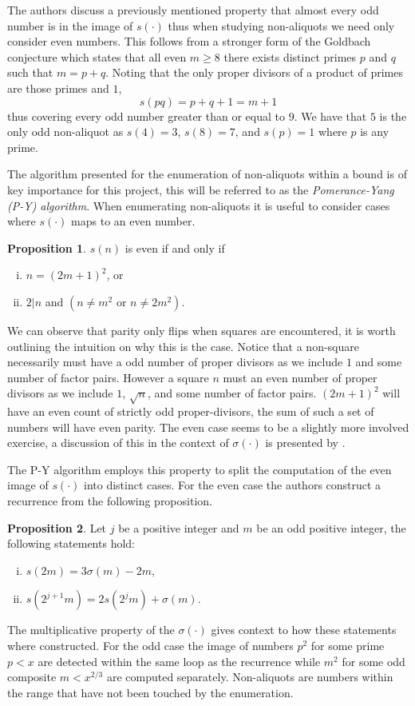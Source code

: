 \documentclass{article}
\theoremstyle{definition}
\newtheorem{proposition}{Proposition}[section]
\begin{document}
The authors discuss a previously mentioned property that almost every odd number is in the image of $s(\cdot)$ thus when studying non-aliquots we need only consider even numbers. This follows from a stronger form of the Goldbach conjecture which states that all even $m \geq 8$ there exists distinct primes $p$ and $q$ such that $m = p+q$. Noting that the only proper divisors of a product of primes are those primes and $1$, $$s(pq) = p + q + 1 = m + 1$$ thus covering every odd number greater than or equal to $9$. We have that $5$ is the only odd non-aliquot as $s(4) = 3$, $s(8) = 7$, and $s(p) = 1$ where $p$ is any prime.

The algorithm presented for the enumeration of non-aliquots within a bound is of key importance for this project, this will be referred to as the \textit{Pomerance-Yang (P-Y) algorithm}. When enumerating non-aliquots it is useful to consider cases where $s(\cdot)$ maps to an even number.
\begin{proposition}
    $s(n)$ is even if and only if
    \begin{enumerate}[(i)]
        \item $n = (2m+1)^2$, or
        \item $2 | n$ and $(n \neq m^2 \text{ or } n \neq 2m^2)$.
    \end{enumerate}
\end{proposition}

We can observe that parity only flips when squares are encountered, it is worth outlining the intuition on why this is the case. Notice that a non-square necessarily must have a odd number of proper divisors as we include $1$ and some number of factor pairs. However a square $n$ must an even number of proper divisors as we include $1$, $\sqrt{n}$, and some number of factor pairs. $(2m+1)^2$ will have an even count of strictly odd proper-divisors, the sum of such a set of numbers will have even parity. The even case seems to be a slightly more involved exercise, a discussion of this in the context of $\sigma(\cdot)$ is presented by \cite{sumdiv_odd}. 

The P-Y algorithm employs this property to split the computation of the even image of $s(\cdot)$ into distinct cases. For the even case the authors construct a recurrence from the following proposition.
\begin{proposition}
    Let $j$ be a positive integer and $m$ be an odd positive integer, the following statements hold:
      \begin{enumerate}[(i)]
        \item $s(2m) = 3\sigma(m) - 2m$,
        \item $s(2^{j+1}m) = 2s(2^{j}m) + \sigma(m)$.
    \end{enumerate}
\end{proposition}
The multiplicative property of the $\sigma(\cdot)$ \cite{2021Multiplicative} gives context to how these statements where constructed. For the odd case the image of numbers $p^2$ for some prime $p < x$ are detected within the same loop as the recurrence while $m^2$ for some odd composite $m < x^{2/3}$ are computed separately. Non-aliquots are numbers within the range that have not been touched by the enumeration.
\end{document}
